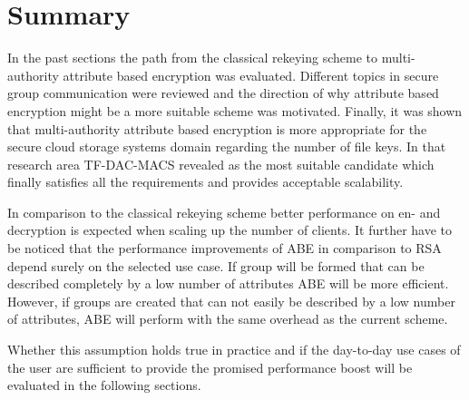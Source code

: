\section{Summary}
In the past sections the path from the classical rekeying scheme to multi-authority attribute based encryption was evaluated. Different topics in secure group communication were reviewed and the direction of why attribute based encryption might be a more suitable scheme was motivated. Finally, it was shown that multi-authority attribute based encryption is more appropriate for the secure cloud storage systems domain regarding the number of file keys. In that research area TF-DAC-MACS revealed as the most suitable candidate which finally satisfies all the requirements and provides acceptable scalability. 

In comparison to the classical rekeying scheme better performance on en- and decryption is expected when scaling up the number of clients. It further have to be noticed that the performance improvements of ABE in comparison to RSA depend surely on the selected use case. If group will be formed that can be described completely by a low number of attributes ABE will be more efficient. However, if groups are created that can not easily be described by a low number of attributes, ABE will perform with the same overhead as the current scheme. 

Whether this assumption holds true in practice and if the day-to-day use cases of the user are sufficient to provide the promised performance boost will be evaluated in the following sections.
